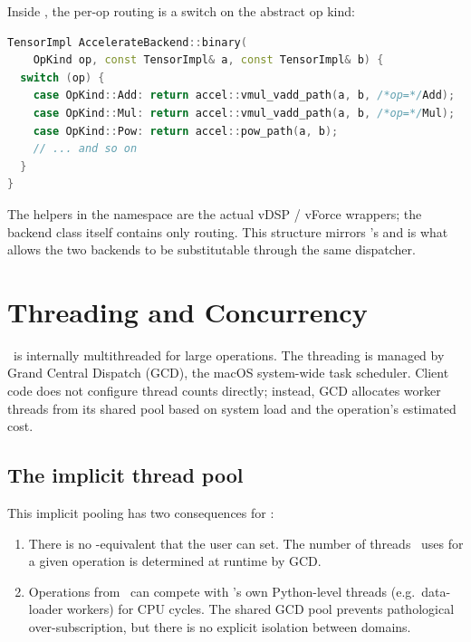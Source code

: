 Inside , the per-op routing is a switch on
the abstract op kind:

\begin{lstlisting}[style=lucidcpp,language=C++]
TensorImpl AccelerateBackend::binary(
    OpKind op, const TensorImpl& a, const TensorImpl& b) {
  switch (op) {
    case OpKind::Add: return accel::vmul_vadd_path(a, b, /*op=*/Add);
    case OpKind::Mul: return accel::vmul_vadd_path(a, b, /*op=*/Mul);
    case OpKind::Pow: return accel::pow_path(a, b);
    // ... and so on
  }
}
\end{lstlisting}

The helpers in the  namespace are the actual vDSP /
vForce wrappers; the backend class itself contains only routing.
This structure mirrors 's and is what allows the
two backends to be substitutable through the same dispatcher.

\section{Threading and Concurrency}
\label{sec:accelerate:threading}

\Accelerate\ is internally multithreaded for large operations. The
threading is managed by Grand Central Dispatch (GCD), the macOS
system-wide task scheduler. Client code does not configure thread
counts directly; instead, GCD allocates worker threads from its
shared pool based on system load and the operation's estimated
cost.

\subsection{The implicit thread pool}
\label{ssec:accelerate:threadpool}

This implicit pooling has two consequences for \Lucid:

\begin{enumerate}
  \item There is no -equivalent that
    the user can set. The number of threads \Accelerate\ uses for a
    given operation is determined at runtime by GCD.
  \item Operations from \Accelerate\ can compete with \Lucid's own
    Python-level threads (e.g.\ data-loader workers) for CPU
    cycles. The shared GCD pool prevents pathological
    over-subscription, but there is no explicit isolation between
    domains.
\end{enumerate}

